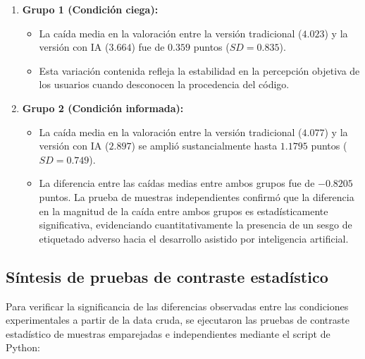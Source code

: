 \begin{enumerate}
    \item \textbf{Grupo 1 (Condición ciega):}
    \begin{itemize}
        \item La caída media en la valoración entre la versión tradicional ($4.023$) y la versión con IA ($3.664$) fue de $0.359$ puntos ($SD = 0.835$).
        \item Esta variación contenida refleja la estabilidad en la percepción objetiva de los usuarios cuando desconocen la procedencia del código.
    \end{itemize}
    \item \textbf{Grupo 2 (Condición informada):}
    \begin{itemize}
        \item La caída media en la valoración entre la versión tradicional ($4.077$) y la versión con IA ($2.897$) se amplió sustancialmente hasta $1.1795$ puntos ($SD = 0.749$).
        \item La diferencia entre las caídas medias entre ambos grupos fue de $-0.8205$ puntos. La prueba de muestras independientes confirmó que la diferencia en la magnitud de la caída entre ambos grupos es estadísticamente significativa, evidenciando cuantitativamente la presencia de un sesgo de etiquetado adverso hacia el desarrollo asistido por inteligencia artificial.
    \end{itemize}
\end{enumerate}

\subsection{Síntesis de pruebas de contraste estadístico}

Para verificar la significancia de las diferencias observadas entre las condiciones experimentales a partir de la data cruda, se ejecutaron las pruebas de contraste estadístico de muestras emparejadas e independientes mediante el script de Python:

